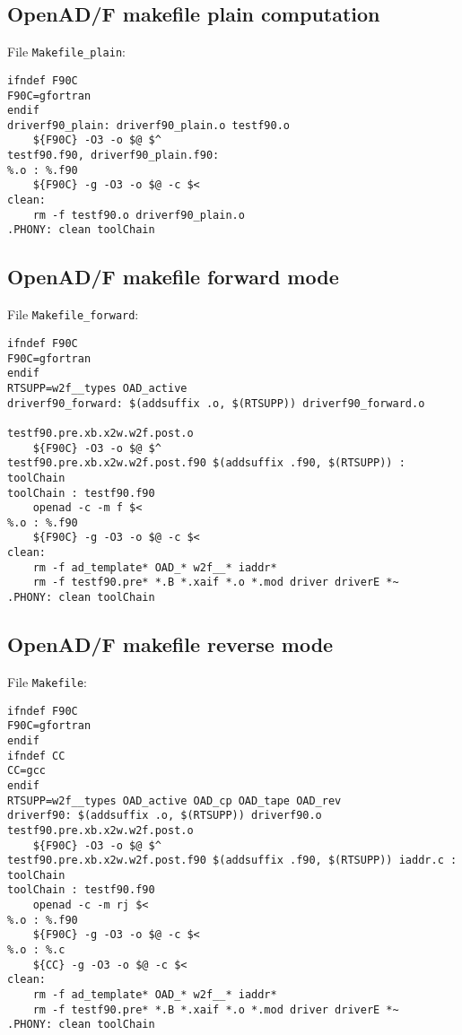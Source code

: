 \documentclass{amsart}
\theoremstyle{plain}
\numberwithin{equation}{section}
\begin{document}
\subsection{OpenAD/F makefile plain computation}

File \verb+Makefile_plain+:

\begin{verbatim}
ifndef F90C
F90C=gfortran
endif
driverf90_plain: driverf90_plain.o testf90.o
	${F90C} -O3 -o $@ $^
testf90.f90, driverf90_plain.f90:
%.o : %.f90
	${F90C} -g -O3 -o $@ -c $<
clean:
	rm -f testf90.o driverf90_plain.o
.PHONY: clean toolChain
\end{verbatim}

\subsection{OpenAD/F makefile forward mode}

File \verb+Makefile_forward+:

\begin{verbatim}
ifndef F90C
F90C=gfortran
endif
RTSUPP=w2f__types OAD_active
driverf90_forward: $(addsuffix .o, $(RTSUPP)) driverf90_forward.o
                                              testf90.pre.xb.x2w.w2f.post.o
	${F90C} -O3 -o $@ $^
testf90.pre.xb.x2w.w2f.post.f90 $(addsuffix .f90, $(RTSUPP)) : toolChain
toolChain : testf90.f90
	openad -c -m f $<
%.o : %.f90
	${F90C} -g -O3 -o $@ -c $<
clean:
	rm -f ad_template* OAD_* w2f__* iaddr*
	rm -f testf90.pre* *.B *.xaif *.o *.mod driver driverE *~
.PHONY: clean toolChain
\end{verbatim}

\subsection{OpenAD/F makefile reverse mode}

File \verb+Makefile+:

\begin{verbatim}
ifndef F90C
F90C=gfortran
endif
ifndef CC
CC=gcc
endif
RTSUPP=w2f__types OAD_active OAD_cp OAD_tape OAD_rev
driverf90: $(addsuffix .o, $(RTSUPP)) driverf90.o testf90.pre.xb.x2w.w2f.post.o
	${F90C} -O3 -o $@ $^
testf90.pre.xb.x2w.w2f.post.f90 $(addsuffix .f90, $(RTSUPP)) iaddr.c : toolChain
toolChain : testf90.f90
	openad -c -m rj $<
%.o : %.f90
	${F90C} -g -O3 -o $@ -c $<
%.o : %.c
	${CC} -g -O3 -o $@ -c $<
clean:
	rm -f ad_template* OAD_* w2f__* iaddr*
	rm -f testf90.pre* *.B *.xaif *.o *.mod driver driverE *~
.PHONY: clean toolChain
\end{verbatim}
\end{document}
